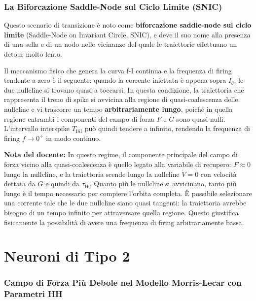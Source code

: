 \subsubsection{La Biforcazione Saddle-Node sul Ciclo Limite (SNIC)}

Questo scenario di transizione è noto come \textbf{biforcazione saddle-node sul ciclo limite} (Saddle-Node on Invariant Circle, SNIC), e deve il suo nome alla presenza di una sella e di un nodo nelle vicinanze del quale le traiettorie effettuano un detour molto lento.

Il meccanismo fisico che genera la curva f-I continua e la frequenza di firing tendente a zero è il seguente: quando la corrente iniettata è appena sopra $I_\theta$, le due nullcline si trovano quasi a toccarsi. In questa condizione, la traiettoria che rappresenta il treno di spike si avvicina alla regione di quasi-coalescenza delle nullcline e vi trascorre un tempo \textbf{arbitrariamente lungo}, poiché in quella regione entrambi i componenti del campo di forza $F$ e $G$ sono quasi nulli. L'intervallo interspike $T_{\text{ISI}}$ può quindi tendere a infinito, rendendo la frequenza di firing $f \to 0^+$ in modo continuo.

\begin{tcolorbox}[colback=gray!5, colframe=gray!40, arc=2mm, boxrule=0.5pt]
\textbf{Nota del docente:} In questo regime, il componente principale del campo di forza vicino alla quasi-coalescenza è quello legato alla variabile di recupero: $F \approx 0$ lungo la nullcline, e la traiettoria scende lungo la nullcline $\dot{V}=0$ con velocità dettata da $G$ e quindi da $\tau_W$. Quanto più le nullcline si avvicinano, tanto più lungo è il tempo necessario per compiere l'orbita completa. È possibile selezionare una corrente tale che le due nullcline siano quasi tangenti: la traiettoria avrebbe bisogno di un tempo infinito per attraversare quella regione. Questo giustifica fisicamente la possibilità di avere una frequenza di firing arbitrariamente bassa.
\end{tcolorbox}

\section{Neuroni di Tipo 2}

\subsubsection{Campo di Forza Più Debole nel Modello Morris-Lecar con Parametri HH}

